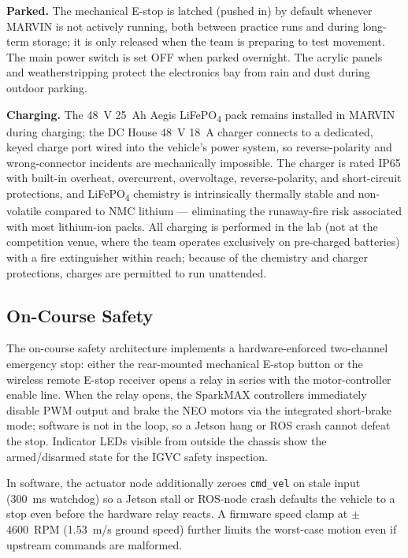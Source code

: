 \documentclass[12pt, letterpaper]{article}
\begin{document}
\textbf{Parked.} The mechanical E-stop is latched (pushed in) by default whenever
MARVIN is not actively running, both between practice runs and during long-term storage;
it is only released when the team is preparing to test movement. The main power switch
is set OFF when parked overnight. The acrylic panels and weatherstripping protect the
electronics bay from rain and dust during outdoor parking.

\textbf{Charging.} The 48~V 25~Ah Aegis LiFePO\textsubscript{4} pack remains installed
in MARVIN during charging; the DC House 48~V 18~A charger connects to a dedicated,
keyed charge port wired into the vehicle's power system, so reverse-polarity and
wrong-connector incidents are mechanically impossible. The charger is rated IP65 with
built-in overheat, overcurrent, overvoltage, reverse-polarity, and short-circuit
protections, and LiFePO\textsubscript{4} chemistry is intrinsically thermally stable
and non-volatile compared to NMC lithium --- eliminating the runaway-fire risk
associated with most lithium-ion packs. All charging is performed in the lab (not at
the competition venue, where the team operates exclusively on pre-charged batteries)
with a fire extinguisher within reach; because of the chemistry and charger
protections, charges are permitted to run unattended.

\subsection{On-Course Safety}

The on-course safety architecture implements a hardware-enforced two-channel emergency
stop: either the rear-mounted mechanical E-stop button or the wireless remote E-stop
receiver opens a relay in series with the motor-controller enable line. When the relay
opens, the SparkMAX controllers immediately disable PWM output and brake the NEO motors
via the integrated short-brake mode; software is not in the loop, so a Jetson hang or
ROS crash cannot defeat the stop. Indicator LEDs visible from outside the chassis show
the armed/disarmed state for the IGVC safety inspection.

In software, the actuator node additionally zeroes \texttt{cmd\_vel} on stale input
(300~ms watchdog) so a Jetson stall or ROS-node crash defaults the vehicle to a stop
even before the hardware relay reacts. A firmware speed clamp at $\pm$4600~RPM
(1.53~m/s ground speed) further limits the worst-case motion even if upstream commands
are malformed.
\end{document}
